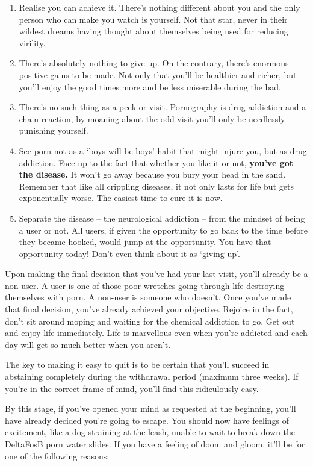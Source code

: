 \documentclass[
]{book}
\begin{document}
\begin{enumerate}
\def\labelenumi{\arabic{enumi}.}
\item
  Realise you can achieve it. There's nothing different about you and the only person who can make you watch is yourself. Not that star, never in their wildest dreams having thought about themselves being used for reducing virility.
\item
  There's absolutely nothing to give up. On the contrary, there's enormous positive gains to be made. Not only that you'll be healthier and richer, but you'll enjoy the good times more and be less miserable during the bad.
\item
  There's no such thing as a peek or visit. Pornography is drug addiction and a chain reaction, by moaning about the odd visit you'll only be needlessly punishing yourself.
\item
  See porn not as a `boys will be boys' habit that might injure you, but as drug addiction. Face up to the fact that whether you like it or not, \textbf{you've got the disease.} It won't go away because you bury your head in the sand. Remember that like all crippling diseases, it not only lasts for life but gets exponentially worse. The easiest time to cure it is now.
\item
  Separate the disease -- the neurological addiction -- from the mindset of being a user or not. All users, if given the opportunity to go back to the time before they became hooked, would jump at the opportunity. You have that opportunity today! Don't even think about it as `giving up'.
\end{enumerate}

Upon making the final decision that you've had your last visit, you'll already be a non-user. A user is one of those poor wretches going through life destroying themselves with porn. A non-user is someone who doesn't. Once you've made that final decision, you've already achieved your objective. Rejoice in the fact, don't sit around moping and waiting for the chemical addiction to go. Get out and enjoy life immediately. Life is marvellous even when you're addicted and each day will get so much better when you aren't.

The key to making it easy to quit is to be certain that you'll succeed in abstaining completely during the withdrawal period (maximum three weeks). If you're in the correct frame of mind, you'll find this ridiculously easy.

By this stage, if you've opened your mind as requested at the beginning, you'll have already decided you're going to escape. You should now have feelings of excitement, like a dog straining at the leash, unable to wait to break down the DeltaFosB porn water slides. If you have a feeling of doom and gloom, it'll be for one of the following reasons:
\end{document}
